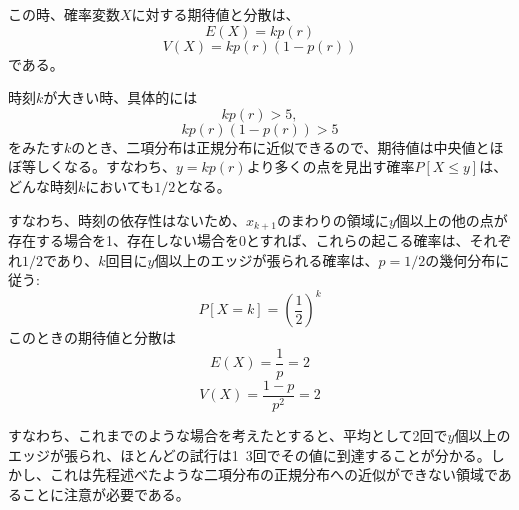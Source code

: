 この時、確率変数$X$に対する期待値と分散は、
\[E(X) = kp(r)\]
\[V(X) = kp(r)(1-p(r))\]
である。

時刻$k$が大きい時、具体的には
\[kp(r) > 5,\]
\[kp(r)(1-p(r)) > 5\]
をみたす$k$のとき、二項分布は正規分布に近似できるので、期待値は中央値とほぼ等しくなる。すなわち、$y=kp(r)$より多くの点を見出す確率$P[X\le y]$は、どんな時刻$k$においても$1/2$となる。

すなわち、時刻の依存性はないため、$x_{k+1}$のまわりの領域に$y$個以上の他の点が存在する場合を1、存在しない場合を0とすれば、これらの起こる確率は、それぞれ$1/2$であり、$k$回目に$y$個以上のエッジが張られる確率は、$p=1/2$の幾何分布に従う:
\[P[X=k] = \left( \frac{1}{2} \right)^{k}\]
このときの期待値と分散は
\[E(X) = \frac{1}{p} = 2\]
\[V(X) = \frac{1-p}{p^{2}} = 2\]

すなわち、これまでのような場合を考えたとすると、平均として2回で$y$個以上のエッジが張られ、ほとんどの試行は1~3回でその値に到達することが分かる。しかし、これは先程述べたような二項分布の正規分布への近似ができない領域であることに注意が必要である。
